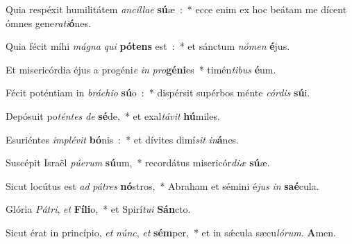 ﻿\item Quia respéxit humilitátem \emph{an}\-\emph{cíl}\-\emph{lae} \textbf{sú}\-æ~:~* ecce enim ex hoc beátam me dícent ómnes gene\emph{ra}\-\emph{ti}\-\textbf{ó}\-nes.
\item Quia fécit míhi \emph{má}\-\emph{gna} \emph{qui} \textbf{pó}\-\textbf{tens} est~:~* et sánctum \emph{nó}\-\emph{men} \textbf{é}\-jus.
\item Et misericórdia éjus a progéni\emph{e} \emph{in} \emph{pro}\-\textbf{gé}\-\textbf{ni}\-es~* timén\emph{ti}\-\emph{bus} \textbf{é}\-um.
\item Fécit poténtiam in \emph{brá}\-\emph{chi}\-\emph{o} \textbf{sú}\-o~:~* dispérsit supérbos ménte \emph{cór}\-\emph{dis} \textbf{sú}\-i.
\item Depósuit po\emph{tén}\-\emph{tes} \emph{de} \textbf{sé}\-de,~* et exal\emph{tá}\-\emph{vit} \textbf{hú}\-miles.
\item Esuriéntes \emph{im}\-\emph{plé}\-\emph{vit} \textbf{bó}\-nis~:~* et dívites dimí\emph{sit} \emph{in}\-\textbf{á}\-nes.
\item Suscépit Israël \emph{pú}\-\emph{e}\-\emph{rum} \textbf{sú}\-um,~* recordátus misericór\emph{di}\-\emph{æ} \textbf{sú}\-æ.
\item Sicut locútus est \emph{ad} \emph{pá}\-\emph{tres} \textbf{nó}\-stros,~* Abraham et sémini é\emph{jus} \emph{in} \textbf{saé}\-cula.
\item Glória \emph{Pá}\-\emph{tri}, \emph{et} \textbf{Fí}\-\textbf{li}\-o,~* et Spirí\emph{tu}\-\emph{i} \textbf{Sán}\-cto.
\item Sicut érat in princípio, \emph{et} \emph{núnc}, \emph{et} \textbf{sém}\-per,~* et in sǽcula sæcu\emph{ló}\-\emph{rum}. \textbf{A}\-men.